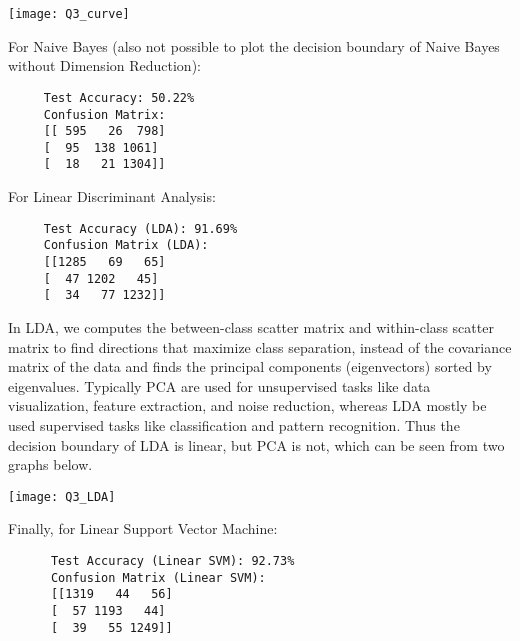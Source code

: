 \documentclass[letterpaper]{article}
\begin{document}
	 \begin{center}
		\texttt{[image: Q3\_curve]}
	\end{center}
	
	 For Naive Bayes (also not possible to plot the decision boundary of Naive Bayes without Dimension Reduction):
	
		\begin{minipage}{\linewidth}
		\begin{Verbatim}
     Test Accuracy: 50.22%
     Confusion Matrix:
     [[ 595   26  798]
     [  95  138 1061]
     [  18   21 1304]]
		\end{Verbatim}
	\end{minipage}

	For Linear Discriminant Analysis:
	
		\begin{minipage}{\linewidth}
		\begin{Verbatim}
     Test Accuracy (LDA): 91.69%
     Confusion Matrix (LDA):
     [[1285   69   65]
     [  47 1202   45]
     [  34   77 1232]]
		\end{Verbatim}
	\end{minipage}
  In LDA, we computes the between-class scatter matrix and within-class scatter matrix to find directions that maximize class separation, instead of the covariance matrix of the data and finds the principal components (eigenvectors) sorted by eigenvalues. Typically PCA are used for unsupervised tasks like data visualization, feature extraction, and noise reduction, whereas LDA mostly be used supervised tasks like classification and pattern recognition. Thus the decision boundary of LDA is linear, but PCA is not, which can be seen from two graphs below. 
  
  
 \begin{center}
	\texttt{[image: Q3\_LDA]}
\end{center}

 Finally, for Linear Support Vector Machine:
 
 		\begin{minipage}{\linewidth}
 	\begin{Verbatim}
      Test Accuracy (Linear SVM): 92.73%
      Confusion Matrix (Linear SVM):
      [[1319   44   56]
      [  57 1193   44]
      [  39   55 1249]]
   	\end{Verbatim}
\end{minipage}
\end{document}
